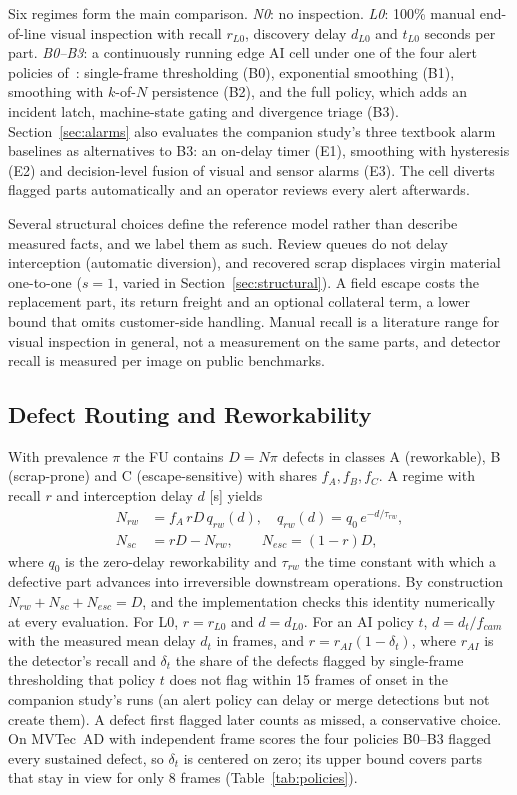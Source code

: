 Six regimes form the main comparison. \emph{N0}: no inspection. \emph{L0}: 100\% manual end-of-line visual inspection with recall $r_{L0}$, discovery delay $d_{L0}$ and $t_{L0}$ seconds per part. \emph{B0--B3}: a continuously running edge AI cell under one of the four alert policies of~\cite{sengar2026paperA}: single-frame thresholding (B0), exponential smoothing (B1), smoothing with $k$-of-$N$ persistence (B2), and the full policy, which adds an incident latch, machine-state gating and divergence triage (B3). Section~\ref{sec:alarms} also evaluates the companion study's three textbook alarm baselines as alternatives to B3: an on-delay timer (E1), smoothing with hysteresis (E2) and decision-level fusion of visual and sensor alarms (E3). The cell diverts flagged parts automatically and an operator reviews every alert afterwards.

Several structural choices define the reference model rather than describe measured facts, and we label them as such. Review queues do not delay interception (automatic diversion), and recovered scrap displaces virgin material one-to-one ($s=1$, varied in Section~\ref{sec:structural}). A field escape costs the replacement part, its return freight and an optional collateral term, a lower bound that omits customer-side handling. Manual recall is a literature range for visual inspection in general, not a measurement on the same parts, and detector recall is measured per image on public benchmarks.

\subsection{Defect Routing and Reworkability}
With prevalence $\pi$ the FU contains $D=N\pi$ defects in classes A (reworkable), B (scrap-prone) and C (escape-sensitive) with shares $f_A,f_B,f_C$. A regime with recall $r$ and interception delay $d$ [s] yields
\begin{align}
N_{rw} &= f_A\, r D\, q_{rw}(d), \quad q_{rw}(d) = q_0\, e^{-d/\tau_{rw}}, \label{eq:rw}\\
N_{sc} &= rD - N_{rw}, \qquad N_{esc} = (1-r)D, \label{eq:sc}
\end{align}
where $q_0$ is the zero-delay reworkability and $\tau_{rw}$ the time constant with which a defective part advances into irreversible downstream operations. By construction $N_{rw}+N_{sc}+N_{esc}=D$, and the implementation checks this identity numerically at every evaluation. For L0, $r=r_{L0}$ and $d=d_{L0}$. For an AI policy $t$, $d=d_t/f_{cam}$ with the measured mean delay $d_t$ in frames, and $r=r_{AI}(1-\delta_t)$, where $r_{AI}$ is the detector's recall and $\delta_t$ the share of the defects flagged by single-frame thresholding that policy $t$ does not flag within 15 frames of onset in the companion study's runs (an alert policy can delay or merge detections but not create them). A defect first flagged later counts as missed, a conservative choice. On MVTec~AD with independent frame scores the four policies B0--B3 flagged every sustained defect, so $\delta_t$ is centered on zero; its upper bound covers parts that stay in view for only 8 frames (Table~\ref{tab:policies}).

